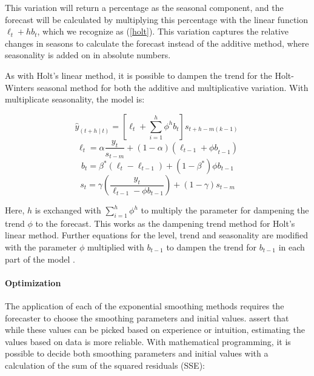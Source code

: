 \documentclass[12pt,a4paper]{article}
\begin{document}
This variation will return a percentage as the seasonal component, and the forecast will be calculated by multiplying this percentage with the linear function $\ell_t+hb_t$, which we recognize as (\ref{holt}). This variation captures the relative changes in seasons to calculate the forecast instead of the additive method, where seasonality is added on in absolute numbers. 

As with Holt’s linear method, it is possible to dampen the trend for the Holt-Winters seasonal method for both the additive and multiplicative variation. With multiplicate seasonality, the model is: 

\begin{equation}
  {\hat{y}}_{\left(t+h\middle| t\right)}=\left[\ell_t+\sum_{i=1}^{h}\phi^hb_t\right]s_{t+h-m\left(k-1\right)}\ 
  \label{holtwinterseasonalmultiplicativedampened}
\end{equation}
\begin{equation}
  \ell_t=\alpha\frac{y_t}{s_{t-m}}+\left(1-\alpha\right)\left(\ell_{t-1}+{\phi b}_{t-1}\right)
  \label{levelholtwinterseasonalmultiplicativedampened}
\end{equation}
\begin{equation}
  b_t=\beta^\ast\left(\ell_t-\ell_{t-1}\right)+\left(1-\beta^\ast\right)\phi b_{t-1}
  \label{trendholtwinterseasonalmultiplicativedampened}
\end{equation}
\begin{equation}
  s_t=\gamma\left(\frac{y_t}{\ell_{t-1}-\phi b_{t-1}}\right)+\left(1-\gamma\right)s_{t-m}
  \label{seasonalholtwinterseasonalmultiplicativedampened}
\end{equation}

Here, $h$ is exchanged with $\sum_{i=1}^{h}\phi^h$ to multiply the parameter for dampening the trend $\phi$ to the forecast. This works as the dampening trend method for Holt’s linear method. Further equations for the level, trend and seasonality are modified with the parameter $\phi$ multiplied with $b_{t-1}$ to dampen the trend for $b_{t-1}$ in each part of the model \parencite{HyndmanForecasting2021}.

\paragraph{Optimization}
The application of each of the exponential smoothing methods requires the forecaster to choose the smoothing parameters and initial values. \cite{HyndmanForecasting2021} assert that while these values can be picked based on experience or intuition, estimating the values based on data is more reliable. With mathematical programming, it is possible to decide both smoothing parameters and initial values with a calculation of the sum of the squared residuals (SSE):
\end{document}
